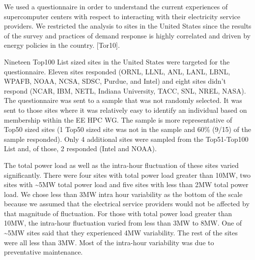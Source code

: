 
We used a questionnaire in order to understand the current experiences of
supercomputer centers with respect to interacting with their electricity
service providers. We restricted the analysis to sites in the United States
since the results of the survey and practices of demand response is highly
correlated and driven by energy policies in the country. 
\cite{torriti_demand_2010}
[Tor10].

Nineteen Top100 List sized sites in the United States were targeted for the
questionnaire. Eleven sites responded (ORNL, LLNL, ANL, LANL, LBNL, WPAFB,
NOAA, NCSA, SDSC, Purdue, and Intel) and eight sites didn't respond (NCAR,
IBM, NETL, Indiana University, TACC, SNL, NREL, NASA). The questionnaire was
sent to a sample that was not randomly selected. It was sent to those sites
where it was relatively easy to identify an individual based on membership
within the EE HPC WG. The sample is more representative of Top50 sized sites
(1 Top50 sized site was not in the sample and 60{\%} (9/15) of the sample
responded). Only 4 additional sites were sampled from the Top51-Top100 List
and, of those, 2 responded (Intel and NOAA).

The total power load as well as the intra-hour fluctuation of these sites
varied significantly. There were four sites with total power load greater
than 10MW, two sites with \textasciitilde 5MW total power load and five
sites with less than 2MW total power load. We chose less than 3MW intra hour
variability as the bottom of the scale because we assumed that the
electrical service providers would not be affected by that magnitude of
fluctuation. For those with total power load greater than 10MW, the
intra-hour fluctuation varied from less than 3MW to 8MW. One of
\textasciitilde 5MW sites said that they experienced 4MW variability. The
rest of the sites were all less than 3MW. Most of the intra-hour variability
was due to preventative maintenance.


